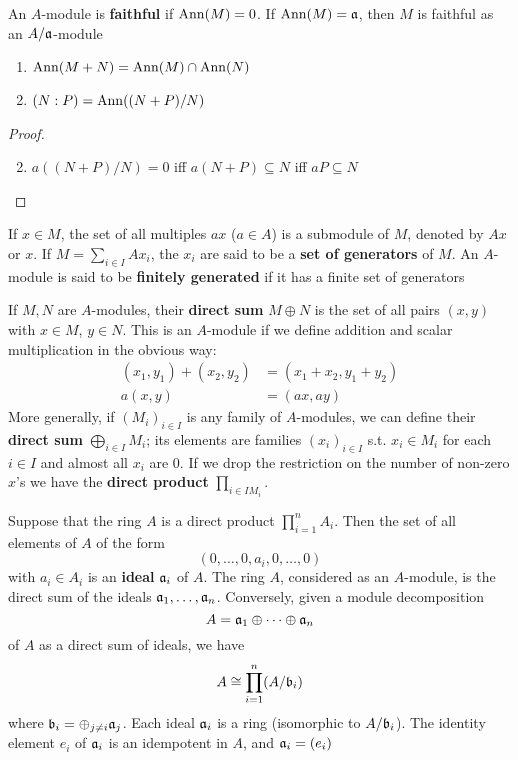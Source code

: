 \documentclass[11pt]{article}
\begin{document}
An \(A\)-module is \textbf{faithful} if \(\operatorname{Ann}(M)=0\). If \(\operatorname{Ann}(M)=\mathfrak{a}\), then \(M\) is faithful as
an \(A/\mathfrak{a}\)-module

\begin{exercise}
\begin{enumerate}
\item \(\operatorname{Ann}(M+N)=\operatorname{Ann}(M)\cap\operatorname{Ann}(N)\)
\item \((N:P)=\operatorname{Ann}((N+P)/N)\)
\end{enumerate}
\end{exercise}

\begin{proof}
\begin{enumerate}
\setcounter{enumi}{1}
\item \(a((N+P)/N)=0\) iff \(a(N+P)\subseteq N\) iff \(aP\subseteq N\)
\end{enumerate}
\end{proof}

If \(x\in M\), the set of all multiples \(ax\) (\(a\in A\)) is a submodule of \(M\), denoted
by \(Ax\) or \(x\). If \(M=\sum_{i\in I}Ax_i\), the \(x_i\) are said to be a \textbf{set of generators}
of \(M\). An \(A\)-module is said to be \textbf{finitely generated} if it has a finite set of generators

If \(M,N\) are \(A\)-modules, their \textbf{direct sum} \(M\oplus N\) is the set of all pairs \((x,y)\)
with \(x\in M\), \(y\in N\). This is an \(A\)-module if we define addition and scalar multiplication
in the obvious way:
\begin{align*}
(x_1,y_1)+(x_2,y_2)&=(x_1+x_2,y_1+y_2)\\
a(x,y)&=(ax,ay)
\end{align*}
More generally, if \((M_i)_{i\in I}\) is any family of \(A\)-modules, we can define their \textbf{direct
sum} \(\bigoplus_{i\in I}M_i\); its elements are families \((x_i)_{i\in I}\) s.t. \(x_i\in M_i\) for each \(i\in I\)
and almost all \(x_i\) are 0. If we drop the restriction on the number of non-zero \(x\)'s we
have the \textbf{direct product} \(\prod_{i\in IM_i}\).

Suppose that the ring \(A\) is a direct product \(\prod_{i=1}^nA_i\). Then the set of all elements
of \(A\) of the form
\begin{equation*}
(0,\dots,0,a_i,0,\dots,0)
\end{equation*}
with \(a_i\in A_i\) is an \textbf{ideal} \(\mathfrak{a}_i\) of \(A\). The ring \(A\), considered as an \(A\)-module, is
the direct sum of the ideals \(\mathfrak{a}_1,\dots,\mathfrak{a}_n\). Conversely, given a module decomposition
\begin{equation*}
A=\mathfrak{a}_1\oplus\dots\oplus\mathfrak{a}_n
\end{equation*}
of \(A\) as a direct sum of ideals, we have
\begin{equation*}
A\cong\prod_{i=1}^n(A/\mathfrak{b}_i)
\end{equation*}
where \(\mathfrak{b}_i=\oplus_{j\neq i}\mathfrak{a}_j\). Each ideal \(\mathfrak{a}_i\) is a ring (isomorphic to \(A/\mathfrak{b}_i\)). The identity
element \(e_i\) of \(\mathfrak{a}_i\) is an idempotent in \(A\), and \(\mathfrak{a}_i=(e_i)\)
\end{document}
